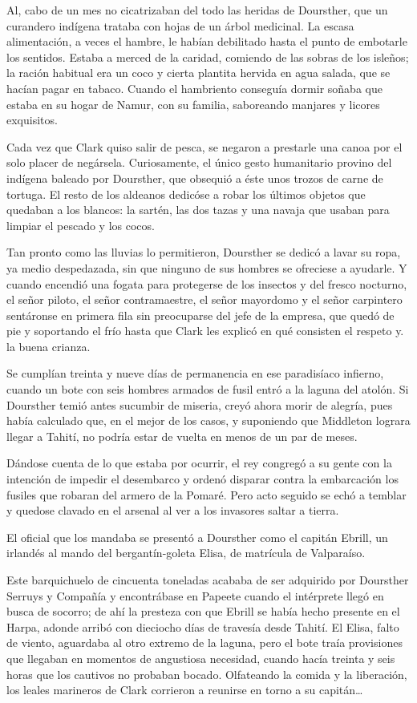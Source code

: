 \documentclass[10pt,twoside,openright]{memoir}
\begin{document}
Al, cabo de un mes no cicatrizaban del todo las heridas de Doursther,
que un curandero indígena trataba con hojas de un árbol medicinal. La
escasa alimentación, a veces el hambre, le habían debilitado hasta el
punto de embotarle los sentidos. Estaba a merced de la caridad, comiendo
de las sobras de los isleños; la ración habitual era un coco y cierta
plantita hervida en agua salada, que se hacían pagar en tabaco. Cuando
el hambriento conseguía dormir soñaba que estaba en su hogar de Namur,
con su familia, saboreando manjares y licores exquisitos.

Cada vez que Clark quiso salir de pesca, se negaron a prestarle una
canoa por el solo placer de negársela. Curiosamente, el único gesto
humanitario provino del indígena baleado por Doursther, que obsequió a
éste unos trozos de carne de tortuga. El resto de los aldeanos dedicóse
a robar los últimos objetos que quedaban a los blancos: la sartén, las
dos tazas y una navaja que usaban para limpiar el pescado y los cocos.

Tan pronto como las lluvias lo permitieron, Doursther se dedicó a lavar
su ropa, ya medio despedazada, sin que ninguno de sus hombres se
ofreciese a ayudarle. Y cuando encendió una fogata para protegerse de
los insectos y del fresco nocturno, el señor piloto, el señor
contramaestre, el señor mayordomo y el señor carpintero sentáronse en
primera fila sin preocuparse del jefe de la empresa, que quedó de pie y
soportando el frío hasta que Clark les explicó en qué consisten el
respeto y. la buena crianza.

Se cumplían treinta y nueve días de permanencia en ese paradisíaco
infierno, cuando un bote con seis hombres armados de fusil entró a la
laguna del atolón. Si Doursther temió antes sucumbir de miseria, creyó
ahora morir de alegría, pues había calculado que, en el mejor de los
casos, y suponiendo que Middleton lograra llegar a Tahití, no podría
estar de vuelta en menos de un par de meses.

Dándose cuenta de lo que estaba por ocurrir, el
rey congregó a su gente con la
intención de impedir el desembarco y ordenó disparar contra la
embarcación los fusiles que robaran del armero de la Pomaré. Pero acto
seguido se echó a temblar y quedose clavado en el arsenal al ver a los
invasores saltar a tierra.

El oficial que los mandaba se presentó a Doursther como el capitán
Ebrill, un irlandés al mando del bergantín-goleta Elisa, de matrícula de
Valparaíso.

Este barquichuelo de cincuenta
toneladas acababa de ser adquirido por Doursther Serruys y Compañía y
encontrábase en Papeete cuando el intérprete llegó en busca de socorro;
de ahí la presteza con que Ebrill se había hecho presente en el Harpa,
adonde arribó con dieciocho días de travesía desde Tahití. El Elisa,
falto de viento, aguardaba al otro extremo de la laguna, pero el bote
traía provisiones que llegaban en momentos de angustiosa necesidad,
cuando hacía treinta y seis horas que los cautivos no probaban bocado.
Olfateando la comida y la liberación, los leales marineros de Clark
corrieron a reunirse en torno a su capitán\ldots
\end{document}
